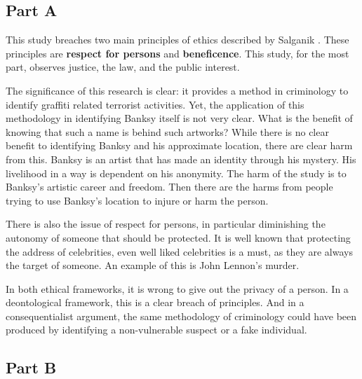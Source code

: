 \documentclass[../ass.tex]{subfiles}
\begin{document}
\subsection{Part A}
This study \cite{tagging_banksy} breaches two main principles of ethics described by Salganik \cite{salganik_2019}.
These principles are \textbf{respect for persons} and \textbf{beneficence}.
This study, for the most part, observes justice, the law, and the public interest.

The significance of this research is clear: it provides a method in criminology to identify graffiti related terrorist activities. 
Yet, the application of this methodology in identifying Banksy itself is not very clear. 
What is the benefit of knowing that such a name is behind such artworks?
While there is no clear benefit to identifying Banksy and his approximate location, there are clear harm from this. 
Banksy is an artist that has made an identity through his mystery. 
His livelihood in a way is dependent on his anonymity. 
The harm of the study is to Banksy's artistic career and freedom.
Then there are the harms from people trying to use Banksy's location to injure or harm the person.

There is also the issue of respect for persons, in particular diminishing the autonomy of someone that should be protected. 
It is well known that protecting the address of celebrities, even well liked celebrities is a must, as they are always the target of someone. 
An example of this is John Lennon's murder.

In both ethical frameworks, it is wrong to give out the privacy of a person. 
In a deontological framework, this is a clear breach of principles. 
And in a consequentialist argument, the same methodology of criminology could have been produced by identifying a non-vulnerable suspect or a fake individual. 

\subsection{Part B}
\end{document}
